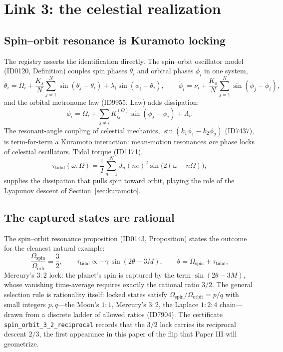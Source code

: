 \documentclass[11pt]{article}
\theoremstyle{remark}
\begin{document}
\section{Link 3: the celestial realization}
\label{sec:celestial}

\subsection{Spin--orbit resonance is Kuramoto locking}

The registry asserts the identification directly. The spin--orbit oscillator model (ID0120, Definition) couples spin phases $\theta_i$ and orbital phases $\phi_i$ in one system,
\begin{equation}
\dot{\theta}_i = \Omega_i + \frac{K_s}{N}\sum_{j=1}^{N}\sin(\theta_j - \theta_i) + \lambda_i \sin(\phi_i - \theta_i), \qquad
\dot{\phi}_i = \nu_i + \frac{K_o}{N}\sum_{j=1}^{N}\sin(\phi_j - \phi_i),
\label{eq:spinorbit}
\end{equation}
and the orbital metronome law (ID9955, Law) adds dissipation:
\begin{equation}
\dot{\phi}_i = \Omega_i + \sum_{j \neq i} K^{(O)}_{ij} \sin(\phi_j - \phi_i) + \Lambda_i.
\end{equation}
The resonant-angle coupling of celestial mechanics, $\sin(k_1\phi_1 - k_2\phi_2)$ (ID7437), is term-for-term a Kuramoto interaction: mean-motion resonances \emph{are} phase locks of celestial oscillators. Tidal torque (ID1171),
\begin{equation}
\tau_{\mathrm{tidal}}(\omega, \Omega) = \frac{1}{I}\sum_{n=1}^{N} J_n(ne)^2 \sin\big(2(\omega - n\Omega)\big),
\end{equation}
supplies the dissipation that pulls spin toward orbit, playing the role of the Lyapunov descent of Section~\ref{sec:kuramoto}.

\subsection{The captured states are rational}

The spin--orbit resonance proposition (ID0143, Proposition) states the outcome for the cleanest natural example:
\begin{equation}
\frac{\Omega_{\mathrm{spin}}}{\Omega_{\mathrm{orb}}} = \frac{3}{2}, \qquad
\tau_{\mathrm{tidal}} \propto -\gamma\, \sin(2\theta - 3M), \qquad
\dot{\theta} = \Omega_{\mathrm{spin}} + \tau_{\mathrm{tidal}},
\label{eq:mercury}
\end{equation}
Mercury's $3{:}2$ lock: the planet's spin is captured by the term $\sin(2\theta - 3M)$, whose vanishing time-average requires exactly the rational ratio $3/2$. The general selection rule is rationality itself: locked states satisfy $\Omega_{\mathrm{spin}}/\Omega_{\mathrm{orbit}} = p/q$ with small integers $p, q$---the Moon's $1{:}1$, Mercury's $3{:}2$, the Laplace $1{:}2{:}4$ chain---drawn from a discrete ladder of allowed ratios (ID7904). The certificate \texttt{spin\_orbit\_3\_2\_reciprocal} records that the $3/2$ lock carries its reciprocal descent $2/3$, the first appearance in this paper of the flip that Paper III will geometrize.
\end{document}
